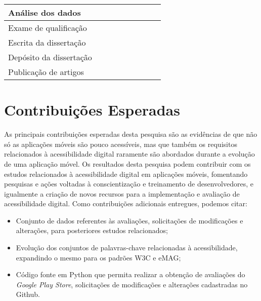 \begin{table}[h]
\begin{tabular}{|l|c|c|c|c|c|c|c|c|}
  Análise dos dados
  & \x & \x & \x & \x & \x  & \x & \y & \y \\
  \hline  
  \hline
  
  Exame de qualificação
  & \x & \x & \x & \x & \x  & \y & \x & \x \\
  \hline  
  
  Escrita da dissertação
  & \x & \x & \x & \x & \x  & \x & \y & \y \\
  \hline  
  
  Depósito da dissertação
  & \x & \x & \x & \x & \x  & \x & \x & \y \\
  \hline  
  
  Publicação de artigos
  & \x & \x & \y & \x & \x  & \x & \x & \y \\
  \hline  
  
 
\end{tabular}
 \normalsize
\end{table}




\section{Contribuições Esperadas}
As principais contribuições esperadas desta pesquisa são as evidências de que não só as aplicações móveis são pouco acessíveis, mas que também os requisitos relacionados à acessibilidade digital raramente são abordados durante a evolução de uma aplicação móvel.
Os resultados desta pesquisa podem contribuir com os estudos relacionados à acessibilidade digital em aplicações móveis, fomentando pesquisas e ações voltadas à conscientização e treinamento de desenvolvedores, e igualmente a criação de novos recursos para
a implementação e avaliação de acessibilidade digital.
Como contribuições adicionais entregues, podemos citar:

\begin{itemize}
	\item Conjunto de dados referentes às avaliações, solicitações de modificações e alterações, para posteriores estudos relacionados;
	\item Evolução dos conjuntos de palavras-chave relacionadas à acessibilidade, expandindo o mesmo para os padrões W3C e eMAG;
	\item Código fonte em Python que permita realizar a obtenção de avaliações do \textit{Google Play Store}, solicitações de modificações e alterações cadastradas no Github.
\end{itemize}



